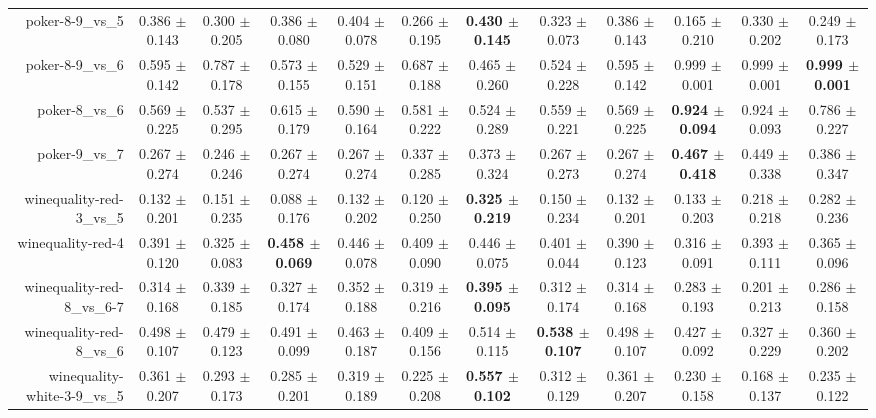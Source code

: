 \begin{table}[!ht]
{\begin{tabular}{r c c c c c c c c c c c}
poker-8-9\_vs\_5 & 0.386 $\pm$ 0.143 & 0.300 $\pm$ 0.205 & 0.386 $\pm$ 0.080 & 0.404 $\pm$ 0.078 & 0.266 $\pm$ 0.195 & \textbf{0.430 $\pm$ 0.145} & 0.323 $\pm$ 0.073 & 0.386 $\pm$ 0.143 & 0.165 $\pm$ 0.210 & 0.330 $\pm$ 0.202 & 0.249 $\pm$ 0.173 \\
poker-8-9\_vs\_6 & 0.595 $\pm$ 0.142 & 0.787 $\pm$ 0.178 & 0.573 $\pm$ 0.155 & 0.529 $\pm$ 0.151 & 0.687 $\pm$ 0.188 & 0.465 $\pm$ 0.260 & 0.524 $\pm$ 0.228 & 0.595 $\pm$ 0.142 & 0.999 $\pm$ 0.001 & 0.999 $\pm$ 0.001 & \textbf{0.999 $\pm$ 0.001} \\
poker-8\_vs\_6 & 0.569 $\pm$ 0.225 & 0.537 $\pm$ 0.295 & 0.615 $\pm$ 0.179 & 0.590 $\pm$ 0.164 & 0.581 $\pm$ 0.222 & 0.524 $\pm$ 0.289 & 0.559 $\pm$ 0.221 & 0.569 $\pm$ 0.225 & \textbf{0.924 $\pm$ 0.094} & 0.924 $\pm$ 0.093 & 0.786 $\pm$ 0.227 \\
poker-9\_vs\_7 & 0.267 $\pm$ 0.274 & 0.246 $\pm$ 0.246 & 0.267 $\pm$ 0.274 & 0.267 $\pm$ 0.274 & 0.337 $\pm$ 0.285 & 0.373 $\pm$ 0.324 & 0.267 $\pm$ 0.273 & 0.267 $\pm$ 0.274 & \textbf{0.467 $\pm$ 0.418} & 0.449 $\pm$ 0.338 & 0.386 $\pm$ 0.347 \\
winequality-red-3\_vs\_5 & 0.132 $\pm$ 0.201 & 0.151 $\pm$ 0.235 & 0.088 $\pm$ 0.176 & 0.132 $\pm$ 0.202 & 0.120 $\pm$ 0.250 & \textbf{0.325 $\pm$ 0.219} & 0.150 $\pm$ 0.234 & 0.132 $\pm$ 0.201 & 0.133 $\pm$ 0.203 & 0.218 $\pm$ 0.218 & 0.282 $\pm$ 0.236 \\
winequality-red-4 & 0.391 $\pm$ 0.120 & 0.325 $\pm$ 0.083 & \textbf{0.458 $\pm$ 0.069} & 0.446 $\pm$ 0.078 & 0.409 $\pm$ 0.090 & 0.446 $\pm$ 0.075 & 0.401 $\pm$ 0.044 & 0.390 $\pm$ 0.123 & 0.316 $\pm$ 0.091 & 0.393 $\pm$ 0.111 & 0.365 $\pm$ 0.096 \\
winequality-red-8\_vs\_6-7 & 0.314 $\pm$ 0.168 & 0.339 $\pm$ 0.185 & 0.327 $\pm$ 0.174 & 0.352 $\pm$ 0.188 & 0.319 $\pm$ 0.216 & \textbf{0.395 $\pm$ 0.095} & 0.312 $\pm$ 0.174 & 0.314 $\pm$ 0.168 & 0.283 $\pm$ 0.193 & 0.201 $\pm$ 0.213 & 0.286 $\pm$ 0.158 \\
winequality-red-8\_vs\_6 & 0.498 $\pm$ 0.107 & 0.479 $\pm$ 0.123 & 0.491 $\pm$ 0.099 & 0.463 $\pm$ 0.187 & 0.409 $\pm$ 0.156 & 0.514 $\pm$ 0.115 & \textbf{0.538 $\pm$ 0.107} & 0.498 $\pm$ 0.107 & 0.427 $\pm$ 0.092 & 0.327 $\pm$ 0.229 & 0.360 $\pm$ 0.202 \\
winequality-white-3-9\_vs\_5 & 0.361 $\pm$ 0.207 & 0.293 $\pm$ 0.173 & 0.285 $\pm$ 0.201 & 0.319 $\pm$ 0.189 & 0.225 $\pm$ 0.208 & \textbf{0.557 $\pm$ 0.102} & 0.312 $\pm$ 0.129 & 0.361 $\pm$ 0.207 & 0.230 $\pm$ 0.158 & 0.168 $\pm$ 0.137 & 0.235 $\pm$ 0.122 \\

\end{tabular}}
\end{table}
